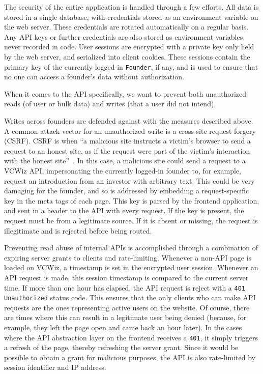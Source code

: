 The security of the entire application is handled through a few efforts. All data is stored in a single database, with credentials stored as an environment variable on the web server. These credentials are rotated automatically on a regular basis. Any API keys or further credentials are also stored as environment variables, never recorded in code. User sessions are encrypted with a private key only held by the web server, and serialized into client cookies. These sessions contain the primary key of the currently logged-in \texttt{Founder}, if any, and is used to ensure that no one can access a founder's data without authorization.

When it comes to the API specifically, we want to prevent both unauthorized reads (of user or bulk data) and writes (that a user did not intend).

Writes across founders are defended against with the measures described above. A common attack vector for an unauthorized write is a cross-site request forgery (CSRF). CSRF is when ``a malicious site instructs a victim's browser to send a request to an honest site, as if the request were part of the victim's interaction with the honest site''~\cite{Barth:2008:RDC:1455770.1455782}. In this case, a malicious site could send a request to a VCWiz API, impersonating the currently logged-in founder to, for example, request an introduction from an investor with arbitrary text. This could be very damaging for the founder, and so is addressed by embedding a request-specific key in the meta tags of each page. This key is parsed by the frontend application, and sent in a header to the API with every request. If the key is present, the request must be from a legitimate source. If it is absent or missing, the request is illegitimate and is rejected before being routed.

Preventing read abuse of internal APIs is accomplished through a combination of expiring server grants to clients and rate-limiting. Whenever a non-API page is loaded on VCWiz, a timestamp is set in the encrypted user session. Whenever an API request is made, this session timestamp is compared to the current server time. If more than one hour has elapsed, the API request is reject with a \texttt{401 Unauthorized} status code. This ensures that the only clients who can make API requests are the ones representing active users on the website. Of course, there are times where this can result in a legitimate user being denied (because, for example, they left the page open and came back an hour later). In the cases where the API abstraction layer on the frontend receives a \texttt{401}, it simply triggers a refresh of the page, thereby refreshing the server grant. Since it would be possible to obtain a grant for malicious purposes, the API is also rate-limited by session identifier and IP address.

